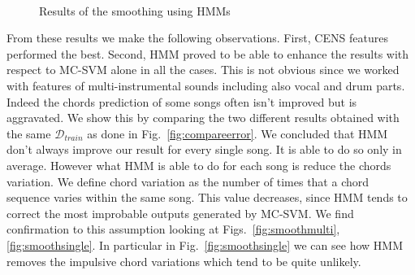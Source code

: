 \begin{figure}[tb]
	\centering
	\\
	\vspace{-3mm}
	\caption{Results of the smoothing using HMMs}
	\vspace{-6mm}
\end{figure}
%
From these results we make the following observations. First, CENS features performed the best. Second, HMM proved to be able to enhance the results with respect to MC-SVM alone in all the cases. This is not obvious since we worked with features of multi-instrumental sounds including also vocal and drum parts. Indeed the chords prediction of some songs often isn't improved but is aggravated. We show this by comparing the two different results obtained with the same $\mathcal{D}_{train}$ as done in Fig.~\ref{fig:compareerror}.
%
We concluded that HMM don't always improve our result for every single song. It is able to do so only in average. However what HMM is able to do for each song is reduce the chords variation. We define chord variation as the number of times that a chord sequence varies within the same song. This value decreases, since HMM tends to correct the most improbable outputs generated by MC-SVM. We find confirmation to this assumption looking at Figs.~\ref{fig:smoothmulti},\ref{fig:smoothsingle}. In particular in Fig.~\ref{fig:smoothsingle} we can see how HMM removes the impulsive chord variations which tend to be quite unlikely.
